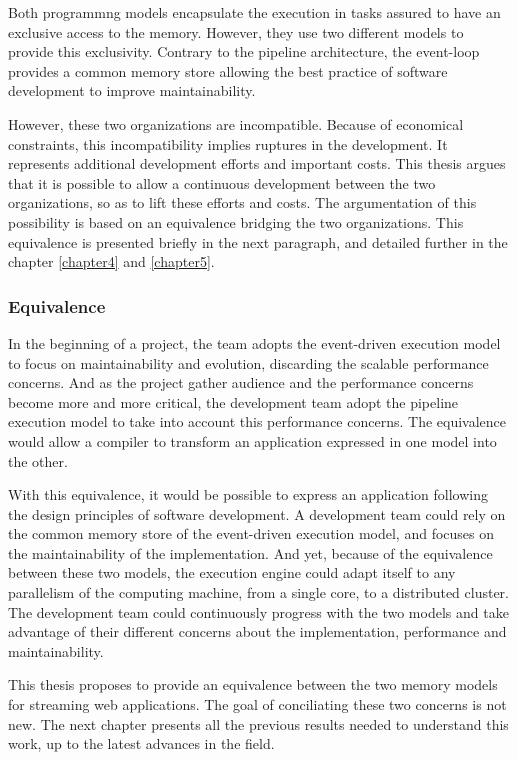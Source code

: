 Both programmng models encapsulate the execution in tasks assured to have an exclusive access to the memory.
However, they use two different models to provide this exclusivity.
Contrary to the pipeline architecture, the event-loop provides a common memory store allowing the best practice of software development to improve maintainability.

However, these two organizations are incompatible.
Because of economical constraints, this incompatibility implies ruptures in the development.
It represents additional development efforts and important costs.
This thesis argues that it is possible to allow a continuous development between the two organizations, so as to lift these efforts and costs.
The argumentation of this possibility is based on an equivalence bridging the two organizations.
This equivalence is presented briefly in the next paragraph, and detailed further in the chapter \ref{chapter4} and \ref{chapter5}.

\subsubsection{Equivalence}

In the beginning of a project, the team adopts the event-driven execution model to focus on maintainability and evolution, discarding the scalable performance concerns.
And as the project gather audience and the performance concerns become more and more critical, the development team adopt the pipeline execution model to take into account this performance concerns.
The equivalence would allow a compiler to transform an application expressed in one model into the other.

With this equivalence, it would be possible to express an application following the design principles of software development.
A development team could rely on the common memory store of the event-driven execution model, and focuses on the maintainability of the implementation.
And yet, because of the equivalence between these two models, the execution engine could adapt itself to any parallelism of the computing machine, from a single core, to a distributed cluster.
The development team could continuously progress with the two models and take advantage of their different concerns about the implementation, performance and maintainability.

\separator

This thesis proposes to provide an equivalence between the two memory models for streaming web applications.
The goal of conciliating these two concerns is not new.
The next chapter presents all the previous results needed to understand this work, up to the latest advances in the field.